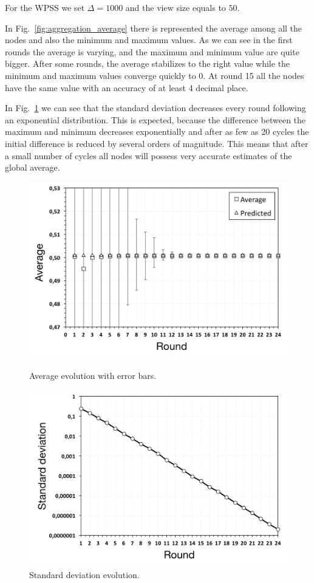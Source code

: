 For the WPSS we set $\Delta = 1000$ and the view size equals to $50$. 

In Fig.~\ref{fig:aggregation_average} there is represented the average among all the nodes and also the minimum and maximum values. As we can see in the first rounds the average is varying, and the maximum and minimum value are quite bigger. After some rounds, the average stabilizes to the right value while the minimum and maximum values converge quickly to 0. At round 15 all the nodes have the same value with an accuracy of at least 4 decimal place. 

In Fig.~\ref{fig:aggregation_standard_deviation} we can see that the standard deviation decreases every round following an exponential distribution. This is expected, because the difference between the maximum and minimum decreases exponentially and after as few as 20 cycles the initial difference is reduced by several orders of magnitude. This means that after a small number of cycles all nodes will possess very accurate estimates of the global average.

\begin{figure}[p]
\centering
\includegraphics[keepaspectratio=true, width=\textwidth]{images/aggregation_average}
\caption{Average evolution with error bars.}
\label{fig:aggregation_average}
\includegraphics[keepaspectratio=true, width=\textwidth]{images/aggregation_standard_deviation}
\caption{Standard deviation evolution.}
\label{fig:aggregation_standard_deviation}
\end{figure}

